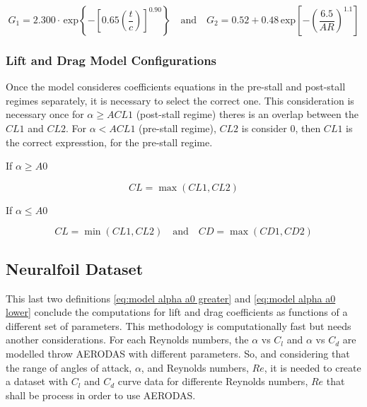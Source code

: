 \begin{equation}
    G_1 = 2.300\cdot\,\mathrm{exp}\left\{-\left[0.65\left(\frac{t}{c}\right)\right]^{0.90}\right\} \quad \text{and} \quad G_2 = 0.52 + 0.48\,\mathrm{exp}\left[-\left(\frac{6.5}{A R}\right)^{1.1}\right]
\end{equation}



\subsubsection{Lift and Drag Model Configurations}

Once the model consideres coefficients equations in the pre-stall and post-stall regimes separately, it is necessary to select the correct one. This consideration is necessary once for $\alpha \geq ACL1$ (post-stall regime) theres is an overlap between the $CL1$ and $CL2$. For $\alpha < ACL1$ (pre-stall regime), $CL2$ is consider 0, then $CL1$ is the correct expresstion, for the pre-stall regime.

If $\alpha \geq A0$

\begin{equation}
    C L=\operatorname*{max}(CL1, CL2)
    \label{eq:model alpha a0 greater}    
\end{equation}

If $\alpha \leq A0$

\begin{equation}
    CL = \operatorname*{min}(CL1 , CL2) \quad \text{and} \quad CD = \operatorname*{max}(CD1, CD2)
    \label{eq:model alpha a0 lower}
\end{equation}

\subsection{Neuralfoil Dataset}

This last two definitions \ref{eq:model alpha a0 greater} and \ref{eq:model alpha a0 lower} conclude the computations for lift and drag coefficients as functions of a different set of parameters. This methodology is computationally fast but needs another considerations. For each Reynolds numbers, the $\alpha$ vs $C_l$ and $\alpha$ vs $C_d$ are modelled throw AERODAS with different parameters. So, and considering that the range of angles of attack, $\alpha$, and Reynolds numbers, $Re$, it is needed to create a dataset with $C_l$ and $C_d$ curve data for differente Reynolds numbers, $Re$ that shall be process in order to use AERODAS.

